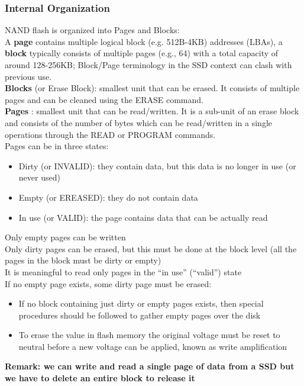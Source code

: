 \documentclass[10pt, oneside]{article}
\begin{document}
\subsubsection{Internal Organization}
NAND flash is organized into Pages and Blocks:\\
A {\bf page} contains multiple logical block (e.g. 512B-4KB) addresses (LBAs), a {\bf block} typically consists of multiple pages (e.g., 64) with a total capacity of around 128-256KB; Block/Page terminology in the SSD context can clash with previous use.\\
{\bf Blocks} (or Erase Block): smallest unit that can be erased. It consists of multiple pages and can be cleaned using the ERASE command.\\
{\bf Pages} : smallest unit that can be read/written. It is a sub-unit of an erase block and consists of the number of bytes which can be read/written in a single operations through the READ or PROGRAM commands.\\
Pages can be in three states:
\begin{itemize}
    \item Dirty (or INVALID): they contain data, but this data is no longer in use (or never used)
    \item Empty (or EREASED): they do not contain data
    \item In use (or VALID): the page contains data that can be actually read
\end{itemize}
Only empty pages can be written\\
Only dirty pages can be erased, but this must be done at the block
level (all the pages in the block must be dirty or empty)\\
It is meaningful to read only pages in the “in use” (“valid”) state\\
If no empty page exists, some dirty page must be erased:
\begin{itemize}
    \item If no block containing just dirty or empty pages exists, then special procedures should be followed to gather empty pages over the disk
    \item To erase the value in flash memory the original voltage must be reset to neutral before a new voltage can be applied, known as write amplification
\end{itemize}
{\bf Remark: we can write and read a single page of data from a SSD but we have to delete an entire block to release it}\\
\newline
\end{document}
